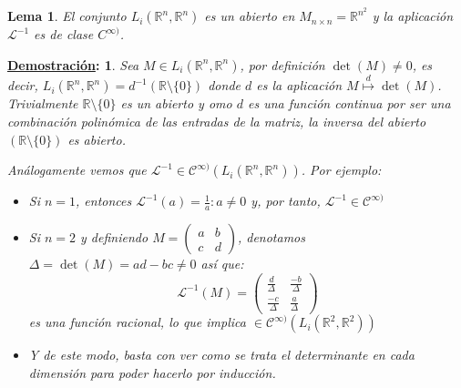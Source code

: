 \documentclass[10pt,a4paper,openright]{book}
\theoremstyle{break}
\newtheorem*{lema}{Lema}
\newtheorem*{demo}{\underline{Demostración}:}
\begin{document}
\begin{lema}
El conjunto $L_i (\mathbb{R}^n, \mathbb{R}^n)$ es un abierto en $M_{n \times n} = \mathbb{R}^{n^2}$ y la aplicación $\mathcal{L}^{-1}$ es de clase $C^{\infty)}$.
\end{lema}

\begin{demo}
Sea $M \in L_i (\mathbb{R}^n, \mathbb{R}^n)$, por definición $\det (M) \neq 0$, es decir, $L_i (\mathbb{R}^n, \mathbb{R}^n) = d^{-1} (\mathbb{R} \setminus \{0\})$ donde $d$ es la aplicación $M \stackrel{d}{\longmapsto} \det(M)$. Trivialmente $\mathbb{R}\setminus{\{0\}}$ es un abierto y omo $d$ es una función continua por ser una combinación polinómica de las entradas de la matriz, la inversa del abierto $(\mathbb{R} \setminus \{0\})$ es abierto.

Análogamente vemos que $\mathcal{L}^{-1} \in \mathcal{C}^{\infty )} (L_i (\mathbb{R}^n, \mathbb{R}^n))$. Por ejemplo:
\begin{itemize}
\item Si $n = 1$, entonces $\mathcal{L}^{-1} (a) = \frac{1}{a} : a \neq 0$ y, por tanto, $\mathcal{L}^{-1} \in \mathcal{C}^{\infty )}$

\item Si $n = 2$ y definiendo $M = \begin{pmatrix} a & b \\ c & d \end{pmatrix}$, denotamos $\Delta = \det (M) = ad -  bc \neq 0$ así que:
$$\mathcal{L}^{-1} (M) = \begin{pmatrix} \frac{d}{\Delta} & \frac{-b} {\Delta} \\ \frac{-c}{\Delta} & \frac{a}{\Delta}\end{pmatrix}$$
es una función racional, lo que implica $\in \mathcal{C}^{\infty )} (L_i (\mathbb{R}^2, \mathbb{R}^2))$

\item Y de este modo, basta con ver como se trata el determinante en cada dimensión para poder hacerlo por inducción.
\end{itemize}
\end{demo}
\end{document}
